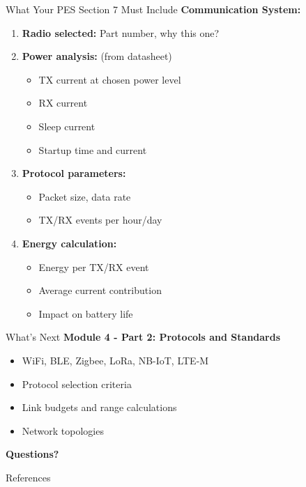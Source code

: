 \documentclass[aspectratio=169,11pt]{beamer}
\begin{document}
\begin{frame}{What Your PES Section 7 Must Include}
    \textbf{Communication System:}
    
    \vspace{0.3cm}
    \begin{enumerate}
        \item \textbf{Radio selected:} Part number, why this one?
        
        \item \textbf{Power analysis:} (from datasheet)
        \begin{itemize}
            \item TX current at chosen power level
            \item RX current
            \item Sleep current
            \item Startup time and current
        \end{itemize}
        
        \item \textbf{Protocol parameters:}
        \begin{itemize}
            \item Packet size, data rate
            \item TX/RX events per hour/day
        \end{itemize}
        
        \item \textbf{Energy calculation:}
        \begin{itemize}
            \item Energy per TX/RX event
            \item Average current contribution
            \item Impact on battery life
        \end{itemize}
    \end{enumerate}
\end{frame}

\begin{frame}{What's Next}
    \textbf{Module 4 - Part 2: Protocols and Standards}
    
    \vspace{0.3cm}
    \begin{itemize}
        \item WiFi, BLE, Zigbee, LoRa, NB-IoT, LTE-M
        \item Protocol selection criteria
        \item Link budgets and range calculations
        \item Network topologies
    \end{itemize}
    
    \vspace{0.5cm}
    \begin{center}
        \Large
        \textbf{Questions?}
    \end{center}
\end{frame}


\begin{frame}[allowframebreaks]{References}
    \printbibliography
\end{frame}
\end{document}
